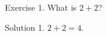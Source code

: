 \documentclass{article}
\begin{document}
Exercise 1. What is $2+2$?
\begin{sol}
Solution 1. $2+2=4$.
\end{sol}

\end{document}
